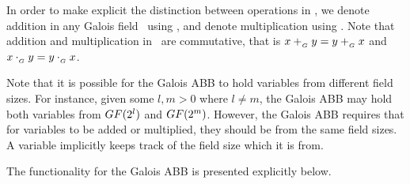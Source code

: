 In order to make explicit the distinction between operations in \GFtwol,
we denote addition in any Galois field \GFtwol~using \Gadd, 
and denote multiplication using \Gmult.
Note that addition and multiplication in \GFtwol~are commutative,
that is $x +_{_G} y = y +_{_G} x$ and $x \cdot_{_G} y = y \cdot_{_G} x$.

Note that it is possible for the Galois ABB to hold variables from 
different field sizes. 
For instance, given some $l, m > 0$ where $l \neq m$, the Galois ABB may hold
both variables from $GF(2^l)$ and $GF(2^m)$.
However, the Galois ABB requires that for variables to be added or multiplied,
they should be from the same field sizes.
A variable implicitly keeps track of the field size which it is from.

The functionality for the Galois ABB is presented explicitly below.

